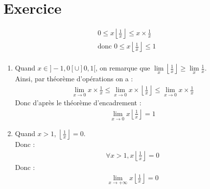 \documentclass{report}
\begin{document}
\setcounter{chapter}{15}
\setcounter{section}{1}
\section{Exercice}
\begin{align*}
    0 \leq x \left\lfloor \frac{1}{x} \right\rfloor \leq x \times \frac{1}{x} \\
    \text{donc } 0 \leq x \left\lfloor \frac{1}{x} \right\rfloor \leq 1 \\
\end{align*}
\begin{enumerate}
    \item Quand $x \in ]-1, 0[ \cup ]0, 1[$, on remarque que $\lim\limits_x \left\lfloor \frac{1}{x} \right\rfloor \geq \lim\limits_x \frac{1}{x}$. \\
    Ainsi, par théorème d'opérations on a :
    \begin{align*}
        \lim_{x\to 0} x \times \frac{1}{x} \leq \lim_{x\to 0} x \times \left\lfloor \frac{1}{x} \right\rfloor \leq \lim_{x\to 0} x \times \frac{1}{x}
    \end{align*}
    Donc d'après le théorème d'encadrement : 
    \begin{align*}
        \boxed{\lim_{x\to 0} x \left\lfloor \frac{1}{x} \right\rfloor = 1}
    \end{align*}

    \item Quand $x > 1$, $\left\lfloor \frac{1}{x} \right\rfloor = 0$. \\
    Donc : 
    \begin{align*}
        \forall x > 1, x \left\lfloor \frac{1}{x} \right\rfloor = 0
    \end{align*}
    Donc : 
    \begin{align*}
        \boxed{\lim_{x\to +\infty} x \left\lfloor \frac{1}{x} \right\rfloor = 0} 
    \end{align*}
\end{enumerate}

\setcounter{section}{5}
\end{document}

